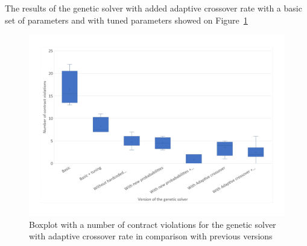 The results of the genetic solver with added adaptive crossover rate with a basic set of parameters and with tuned parameters showed on Figure~\ref{fig:boxplotsolverAdaptiveCrossoverTuning}
\begin{figure}
	\centering
	\includegraphics[width=\textwidth]{images/BoxPlotSolverAdaptiveCrossoverTuning.pdf}
	\caption[Boxplot with a number of contract violations for the genetic solver with adaptive crossover rate in comparison with previous versions]{Boxplot with a number of contract violations for the genetic solver with adaptive crossover rate in comparison with previous versions}
	\label{fig:boxplotsolverAdaptiveCrossoverTuning}
\end{figure}


